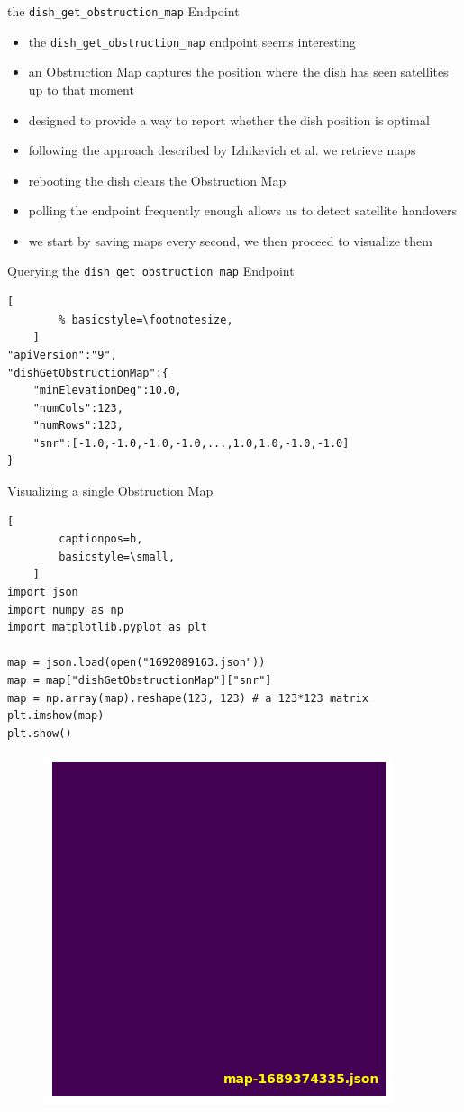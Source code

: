 \documentclass[NET,english,beameralt]{tumbeamer}
\begin{document}
\begin{frame}{the \texttt{dish\_get\_obstruction\_map} Endpoint}
    \begin{itemize}
        \item the \texttt{dish\_get\_obstruction\_map} endpoint seems interesting
        \item an Obstruction Map captures the position where the dish has seen satellites up to that moment
        \item designed to provide a way to report whether the dish position is optimal
        \item following the approach described by Izhikevich et al. \cite{izhikevich2023democratizing} we retrieve maps
        \item rebooting the dish clears the Obstruction Map
        \item polling the endpoint frequently enough allows us to detect satellite handovers
        \item we start by saving maps every second, we then proceed to visualize them
    \end{itemize}
\end{frame}

\begin{frame}[fragile]{Querying the  \texttt{dish\_get\_obstruction\_map} Endpoint }
    \begin{lstlisting}[
        % basicstyle=\footnotesize,
    ]
"apiVersion":"9",
"dishGetObstructionMap":{
    "minElevationDeg":10.0,
    "numCols":123,
    "numRows":123,
    "snr":[-1.0,-1.0,-1.0,-1.0,...,1.0,1.0,-1.0,-1.0]
}
    \end{lstlisting}
\end{frame}

\begin{frame}[fragile]{Visualizing a single Obstruction Map}
    \begin{lstlisting}[
        captionpos=b,
        basicstyle=\small,
    ]
import json
import numpy as np
import matplotlib.pyplot as plt

map = json.load(open("1692089163.json"))
map = map["dishGetObstructionMap"]["snr"]
map = np.array(map).reshape(123, 123) # a 123*123 matrix
plt.imshow(map)
plt.show()
    \end{lstlisting}
\end{frame}

\begin{frame}[fragile]
    \begin{figure}
        \includegraphics[width=0.4\columnwidth]{pics/map1.png}
    \end{figure}
\end{frame}
\end{document}
